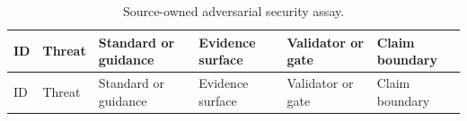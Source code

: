 \documentclass[
]{article}
\begin{document}
\begin{longtable}[]{@{}
  >{\raggedright\arraybackslash}p{}
  >{\raggedright\arraybackslash}p{}
  >{\raggedright\arraybackslash}p{}
  >{\raggedright\arraybackslash}p{}
  >{\raggedright\arraybackslash}p{}
  >{\raggedright\arraybackslash}p{}@{}}
\caption{Source-owned adversarial security
assay.}\label{tbl:security_assay}\tabularnewline
\toprule\noalign{}
\begin{minipage}[b]{\linewidth}\raggedright
ID
\end{minipage} & \begin{minipage}[b]{\linewidth}\raggedright
Threat
\end{minipage} & \begin{minipage}[b]{\linewidth}\raggedright
Standard or guidance
\end{minipage} & \begin{minipage}[b]{\linewidth}\raggedright
Evidence surface
\end{minipage} & \begin{minipage}[b]{\linewidth}\raggedright
Validator or gate
\end{minipage} & \begin{minipage}[b]{\linewidth}\raggedright
Claim boundary
\end{minipage} \\
\midrule\noalign{}
\endfirsthead
\toprule\noalign{}
\begin{minipage}[b]{\linewidth}\raggedright
ID
\end{minipage} & \begin{minipage}[b]{\linewidth}\raggedright
Threat
\end{minipage} & \begin{minipage}[b]{\linewidth}\raggedright
Standard or guidance
\end{minipage} & \begin{minipage}[b]{\linewidth}\raggedright
Evidence surface
\end{minipage} & \begin{minipage}[b]{\linewidth}\raggedright
Validator or gate
\end{minipage} & \begin{minipage}[b]{\linewidth}\raggedright
Claim boundary
\end{minipage} \\

\end{longtable}
\end{document}
